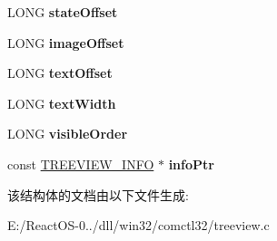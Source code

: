 \begin{DoxyCompactItemize}
\mbox{\label{struct___t_r_e_e_i_t_e_m_a4cac26d555508abf6216d5761236c409}} 
L\+O\+NG {\bfseries state\+Offset}
\item 
\mbox{\label{struct___t_r_e_e_i_t_e_m_a3e64828dd5e605b34555da280e386f6d}} 
L\+O\+NG {\bfseries image\+Offset}
\item 
\mbox{\label{struct___t_r_e_e_i_t_e_m_a51f1993d2b862f12e84481025237be89}} 
L\+O\+NG {\bfseries text\+Offset}
\item 
\mbox{\label{struct___t_r_e_e_i_t_e_m_af0b4b123105e3c2917caeab5b274b349}} 
L\+O\+NG {\bfseries text\+Width}
\item 
\mbox{\label{struct___t_r_e_e_i_t_e_m_aa54ac5d490de4c84050d74ecf61c98fb}} 
L\+O\+NG {\bfseries visible\+Order}
\item 
\mbox{\label{struct___t_r_e_e_i_t_e_m_a75d71b662315c5e76dc73d5cdb3dc898}} 
const \hyperlink{structtag_t_r_e_e_v_i_e_w___i_n_f_o}{T\+R\+E\+E\+V\+I\+E\+W\+\_\+\+I\+N\+FO} $\ast$ {\bfseries info\+Ptr}
\end{DoxyCompactItemize}


该结构体的文档由以下文件生成\+:\begin{DoxyCompactItemize}
\item 
E\+:/\+React\+O\+S-\/0../dll/win32/comctl32/treeview.\+c\end{DoxyCompactItemize}
